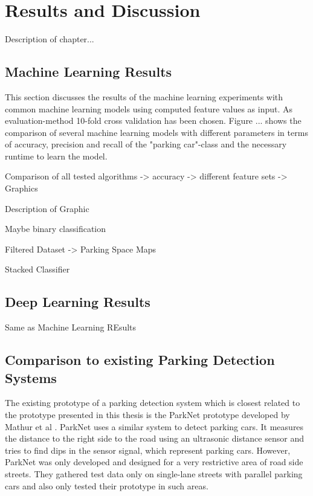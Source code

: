 \chapter{Results and Discussion}
\label{chap:evaluation}

Description of chapter...



\section{Machine Learning Results}

This section discusses the results of the machine learning experiments with common machine learning models using computed feature values as input. As evaluation-method 10-fold cross validation has been chosen. Figure ... shows the comparison of several machine learning models with different parameters in terms of accuracy, precision and recall of the "parking car"-class and the necessary runtime to learn the model.




Comparison of all tested algorithms -> accuracy -> different feature sets -> Graphics

Description of Graphic

Maybe binary classification

Filtered Dataset -> Parking Space Maps

Stacked Classifier


\section{Deep Learning Results}

Same as Machine Learning REsults





\section{Comparison to existing Parking Detection Systems}

The existing prototype of a parking detection system which is closest related to the prototype presented in this thesis is the ParkNet prototype developed by Mathur et al \cite{Mathur:2010:PDS:1814433.1814448}. ParkNet uses a similar system to detect parking cars. It measures the distance to the right side to the road using an ultrasonic distance sensor and tries to find dips in the sensor signal, which represent parking cars. However, ParkNet was only developed and designed for a very restrictive area of road side streets. They gathered test data only on single-lane streets with parallel parking cars and also only tested their prototype in such areas. 

